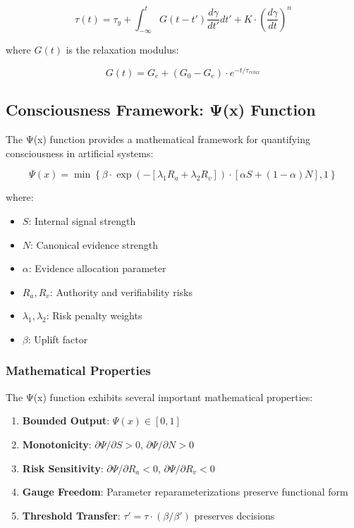 \documentclass[11pt,a4paper]{article}
\begin{document}
\begin{equation}
\tau(t) = \tau_y + \int_{-\infty}^t G(t-t') \frac{d\gamma}{dt'} dt' + K \cdot \left( \frac{d\gamma}{dt} \right)^n
\label{eq:vehb}
\end{equation}

where $G(t)$ is the relaxation modulus:

\begin{equation}
G(t) = G_e + (G_0 - G_e) \cdot e^{-t/\tau_{relax}}
\label{eq:relaxation_modulus}
\end{equation}

\subsection{Consciousness Framework: Ψ(x) Function}
\label{subsec:psi_function}

The Ψ(x) function provides a mathematical framework for quantifying consciousness in artificial systems:

\begin{equation}
\Psi(x) = \min\left\{\beta \cdot \exp\left(-[\lambda_1 R_a + \lambda_2 R_v]\right) \cdot [\alpha S + (1-\alpha)N], 1\right\}
\label{eq:psi_function}
\end{equation}

where:
\begin{itemize}
    \item $S$: Internal signal strength
    \item $N$: Canonical evidence strength
    \item $\alpha$: Evidence allocation parameter
    \item $R_a, R_v$: Authority and verifiability risks
    \item $\lambda_1, \lambda_2$: Risk penalty weights
    \item $\beta$: Uplift factor
\end{itemize}

\subsubsection{Mathematical Properties}
\label{subsubsec:psi_properties}

The Ψ(x) function exhibits several important mathematical properties:

\begin{enumerate}
    \item \textbf{Bounded Output}: $\Psi(x) \in [0,1]$
    \item \textbf{Monotonicity}: $\partial\Psi/\partial S > 0$, $\partial\Psi/\partial N > 0$
    \item \textbf{Risk Sensitivity}: $\partial\Psi/\partial R_a < 0$, $\partial\Psi/\partial R_v < 0$
    \item \textbf{Gauge Freedom}: Parameter reparameterizations preserve functional form
    \item \textbf{Threshold Transfer}: $\tau' = \tau \cdot (\beta/\beta')$ preserves decisions
\end{enumerate}
\end{document}
